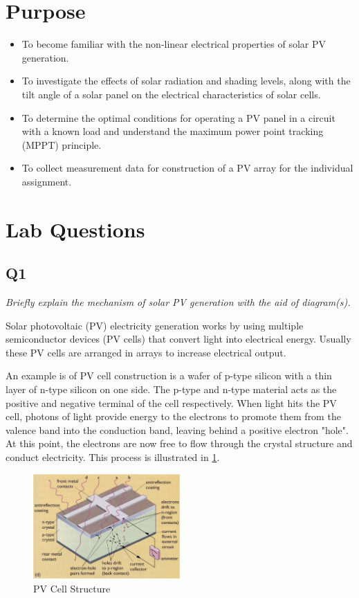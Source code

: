\documentclass{article}
\begin{document}
	
	
	\tableofcontents
	\newpage
	\listoffigures
	\listoftables
	\newpage
	
	\section{Purpose}
		\begin{itemize}
			\item To become familiar with the non-linear electrical properties of solar PV generation.
			\item To investigate the effects of solar radiation and shading levels, along with the tilt angle of a solar panel on the electrical characteristics of solar cells.
			\item To determine the optimal conditions for operating a PV panel in a circuit with a known load and understand the maximum power point tracking (MPPT) principle.
			\item To collect measurement data for construction of a PV array for the individual assignment.
		\end{itemize}
	
	\section{Lab Questions}
	\subsection{Q1}
		\textit{Briefly explain the mechanism of solar PV generation with the aid of diagram(s).}
		
		Solar photovoltaic (PV) electricity generation works by using multiple semiconductor devices (PV cells) that convert light into electrical energy. Usually these PV cells are arranged in arrays to increase electrical output.
		
		An example is of PV cell construction is a wafer of p-type silicon with a thin layer of n-type silicon on one side. The p-type and n-type material acts as the positive and negative terminal of the cell respectively. When light hits the PV cell, photons of light provide energy to the electrons to promote them from the valence band into the conduction band, leaving behind a positive electron "hole". At this point, the electrons are now free to flow through the crystal structure and conduct electricity. This process is illustrated in \cref{fig:PVCellStructure}.
		
		\begin{figure}[H]
			\centering
			\includegraphics[width=0.5\textwidth]{PVCellStructure}
			\caption{PV Cell Structure}
			\label{fig:PVCellStructure}
		\end{figure}
	
\end{document}
